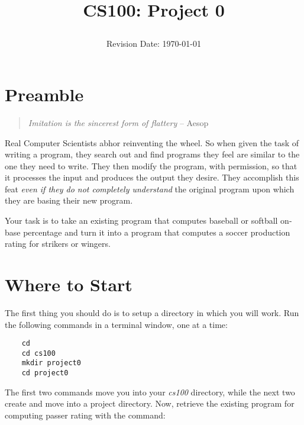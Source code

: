 \documentclass[12pt]{article}
\title{CS100: Project 0\\
\date{Revision Date: \today}}
\begin{document}
\maketitle

\thispagestyle{empty}

\W\subsubsection*{}
\W\htmlrule


\section*{Preamble}

\begin{quote}
{\it Imitation is the sincerest form of flattery}
-- Aesop
\end{quote}

Real Computer Scientists abhor reinventing the wheel. 
So when given the task of writing a program, they search out and find programs
they feel are similar to the one they need to write.
They then modify the program, with permission,
so that it processes the input and
produces the output
they desire.
They accomplish this feat {\it even if they do not completely understand}
the original program upon which they are basing their new program.

Your task is to take an existing program that computes
baseball or softball on-base percentage 
and turn it into a program that computes
a soccer production rating for strikers or wingers.

\section*{Where to Start}

The first thing you should do is to setup a directory in which you will work.
Run the following commands in a terminal window, one at a time:

\begin{verbatim}
    cd
    cd cs100
    mkdir project0
    cd project0
\end{verbatim}

The first two commands move you into your {\it cs100} directory, while the next
two create and move into a project directory.
Now, 
retrieve the existing program for computing passer rating
with the command:
\end{document}
